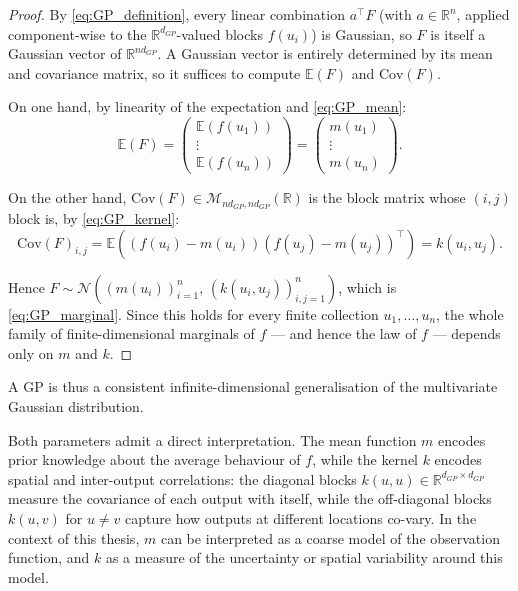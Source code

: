 \begin{proof}
	By \eqref{eq:GP_definition}, every linear combination $a^\top F$ (with
	$a\in\mathbb{R}^n$, applied component-wise to the $\mathbb{R}^{d_{GP}}$-valued
	blocks $f(u_i)$) is Gaussian, so $F$ is itself a Gaussian vector of
	$\mathbb{R}^{nd_{GP}}$. A Gaussian vector is entirely determined by its mean
	and covariance matrix, so it suffices to compute $\mathbb{E}(F)$ and
	$\mathrm{Cov}(F)$.

	On one hand, by linearity of the expectation and \eqref{eq:GP_mean}:
	\begin{equation}
		\mathbb{E}(F)=\begin{pmatrix}\mathbb{E}(f(u_1))\\\vdots\\\mathbb{E}(f(u_n))\end{pmatrix}=\begin{pmatrix}m(u_1)\\\vdots\\m(u_n)\end{pmatrix}.
	\end{equation}

	On the other hand, $\mathrm{Cov}(F)\in\mathcal{M}_{nd_{GP},nd_{GP}}(\mathbb{R})$
	is the block matrix whose $(i,j)$ block is, by \eqref{eq:GP_kernel}:
	\begin{equation}
		\mathrm{Cov}(F)_{i,j}=\mathbb{E}\left((f(u_i)-m(u_i))(f(u_j)-m(u_j))^\top\right)=k(u_i,u_j).
	\end{equation}

	Hence $F\sim\mathcal{N}\left((m(u_i))_{i=1}^n,\,(k(u_i,u_j))_{i,j=1}^n\right)$,
	which is \eqref{eq:GP_marginal}. Since this holds for every finite
	collection $u_1,\dots,u_n$, the whole family of finite-dimensional
	marginals of $f$ --- and hence the law of $f$ --- depends only on $m$ and
	$k$.
\end{proof}

A GP is thus a consistent infinite-dimensional generalisation of the
multivariate Gaussian distribution.

Both parameters admit a direct interpretation.
The mean function $m$ encodes prior knowledge about the average behaviour of
$f$, while the kernel $k$ encodes spatial and inter-output correlations:
the diagonal blocks $k(u,u) \in \mathbb{R}^{d_{GP} \times d_{GP}}$ measure the
covariance of each output with itself, while the off-diagonal blocks
$k(u,v)$ for $u \neq v$ capture how outputs at different locations co-vary.
In the context of this thesis, $m$ can be interpreted as a coarse model of
the observation function, and $k$ as a measure of the uncertainty or spatial
variability around this model.

